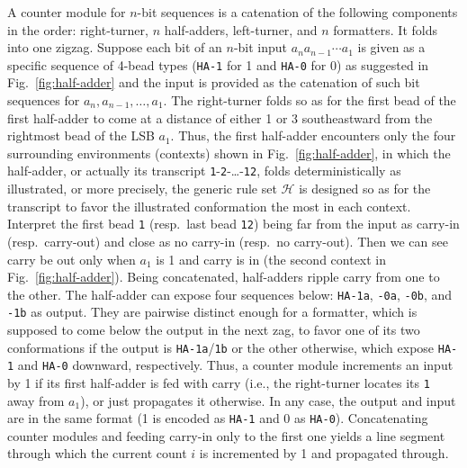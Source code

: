 A counter module for $n$-bit sequences is a catenation of the following components in the order: right-turner, $n$ half-adders, left-turner, and $n$ formatters. 
It folds into one zigzag. 
Suppose each bit of an $n$-bit input $a_n a_{n-1} \cdots a_1$ is given as a specific sequence of 4-bead types ({\tt HA-1} for 1 and {\tt HA-0} for 0) as suggested in Fig.~\ref{fig:half-adder} and the input is provided as the catenation of such bit sequences for $a_n, a_{n-1}, \ldots, a_1$. 
The right-turner folds so as for the first bead of the first half-adder to come at a distance of either 1 or 3 southeastward from the rightmost bead of the LSB $a_1$. 
Thus, the first half-adder encounters only the four surrounding environments (contexts) shown in Fig.~\ref{fig:half-adder}, in which the half-adder, or actually its transcript {\tt 1}-{\tt 2}-\dots-{\tt 12}, folds deterministically as illustrated, or more precisely, the generic rule set $\mathcal{H}$ is designed so as for the transcript to favor the illustrated conformation the most in each context. 
Interpret the first bead {\tt 1} (resp.~last bead {\tt 12}) being far from the input as carry-in (resp.~carry-out) and close as no carry-in (resp.~no carry-out). 
Then we can see carry be out only when $a_1$ is 1 and carry is in (the second context in Fig.~\ref{fig:half-adder}). 
Being concatenated, half-adders ripple carry from one to the other. 
The half-adder can expose four sequences below: {\tt HA-1a}, {\tt -0a}, {\tt -0b}, and {\tt -1b} as output. 
They are pairwise distinct enough for a formatter, which is supposed to come below the output in the next zag, to favor one of its two conformations if the output is {\tt HA-1a}/{\tt 1b} or the other otherwise, which expose {\tt HA-1} and {\tt HA-0} downward, respectively. 
Thus, a counter module increments an input by 1 if its first half-adder is fed with carry (i.e., the right-turner locates its {\tt 1} away from $a_1$), or just propagates it otherwise. 
In any case, the output and input are in the same format (1 is encoded as {\tt HA-1} and 0 as {\tt HA-0}). 
Concatenating counter modules and feeding carry-in only to the first one yields a line segment through which the current count $i$ is incremented by 1 and propagated through. 

